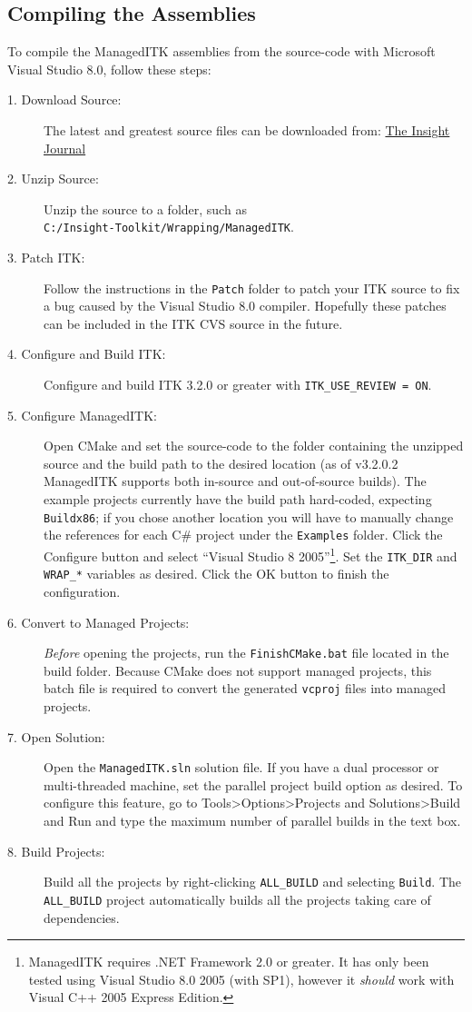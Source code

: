 \documentclass{InsightArticle}
\def\code#1{\texttt{#1}}
\begin{document}
\subsection{Compiling the Assemblies}
To compile the ManagedITK assemblies from the source-code with Microsoft Visual Studio 8.0,
follow these steps:
\begin{description}
	\item[1. Download Source:] The latest and greatest source files can be downloaded 
			from: %
			\href{http://insight-journal.org/dspace/handle/1926/501}
			     {The Insight Journal}
	\item[2. Unzip Source:] Unzip the source to a folder, such as\\ \code{C:/Insight-Toolkit/Wrapping/ManagedITK}.
	\item[3. Patch ITK:] Follow the instructions in the \code{Patch} folder to patch your ITK source 
			to fix a bug caused by the Visual Studio 8.0 compiler.			
			Hopefully these patches can be included in the ITK CVS source in the future.
	\item[4. Configure and Build ITK:] 
			Configure and build ITK 3.2.0 or greater with \code{ITK\_USE\_REVIEW = ON}.
	\item[5. Configure ManagedITK:]
			Open CMake and set the source-code to the 
			folder containing the unzipped source and the build path to the desired location
			(as of v3.2.0.2 ManagedITK supports both in-source and out-of-source builds).
			The example projects currently have the build path hard-coded, expecting \code{Buildx86};
			if you chose another location you will have to manually change the references for
			each C\# project under the \code{Examples} folder.
			Click the Configure button and select ``Visual Studio 8 2005''\footnote{
			ManagedITK requires .NET Framework 2.0 or greater. It has only been tested
			using Visual Studio 8.0 2005 (with SP1), however it \emph{should}
			work with Visual C++ 2005 Express Edition.}.
			Set the \code{ITK\_DIR} and \code{WRAP\_*} variables as desired.
			Click the OK button to finish the configuration.		
	\item[6. Convert to Managed Projects:]
			\emph{Before} opening the projects, run the \code{FinishCMake.bat} 
			file located in the build folder.
			Because CMake does not support managed projects,
			this batch file is required to convert the generated \code{vcproj} 
			files into managed projects.
	\item[7. Open Solution:] Open the \code{ManagedITK.sln} solution file. 
			If you have a dual processor or multi-threaded machine,
			set the parallel project build option as desired.
			To configure this feature, go to Tools\textgreater Options\textgreater Projects 
			and Solutions\textgreater Build and Run and type
			the maximum number of parallel builds in the text box.
	\item[8. Build Projects:]
			Build all the projects by right-clicking \code{ALL\_BUILD} and selecting
			\code{Build}.
			The \code{ALL\_BUILD} project automatically builds all the projects
			taking care of dependencies.
\end{description}
\end{document}
